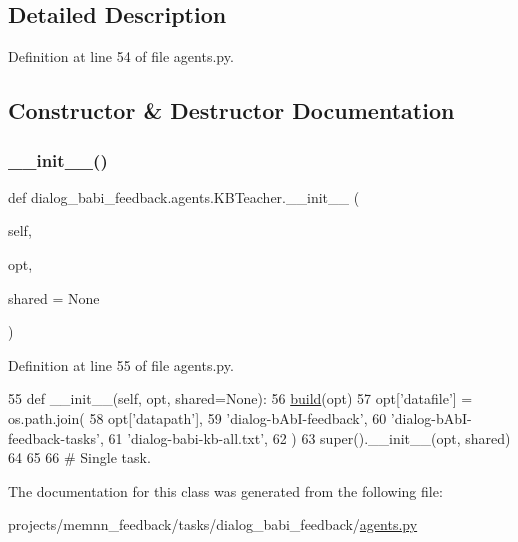 \subsection{Detailed Description}


Definition at line 54 of file agents.\+py.



\subsection{Constructor \& Destructor Documentation}
\mbox{\label{classdialog__babi__feedback_1_1agents_1_1KBTeacher_ad160e36b27da1a5a2d8ff563fb899b09}} 
\subsubsection{\texorpdfstring{\+\_\+\+\_\+init\+\_\+\+\_\+()}{\_\_init\_\_()}}
{\footnotesize\ttfamily def dialog\+\_\+babi\+\_\+feedback.\+agents.\+K\+B\+Teacher.\+\_\+\+\_\+init\+\_\+\+\_\+ (\begin{DoxyParamCaption}\item[{}]{self,  }\item[{}]{opt,  }\item[{}]{shared = {\ttfamily None} }\end{DoxyParamCaption})}



Definition at line 55 of file agents.\+py.


\begin{DoxyCode}
55     \textcolor{keyword}{def }\_\_init\_\_(self, opt, shared=None):
56         \hyperlink{namespaceparlai_1_1mturk_1_1tasks_1_1talkthewalk_1_1download_a8c0fbb9b6dfe127cb8c1bd6e7c4e33fd}{build}(opt)
57         opt[\textcolor{stringliteral}{'datafile'}] = os.path.join(
58             opt[\textcolor{stringliteral}{'datapath'}],
59             \textcolor{stringliteral}{'dialog-bAbI-feedback'},
60             \textcolor{stringliteral}{'dialog-bAbI-feedback-tasks'},
61             \textcolor{stringliteral}{'dialog-babi-kb-all.txt'},
62         )
63         super().\_\_init\_\_(opt, shared)
64 
65 
66 \textcolor{comment}{# Single task.}
\end{DoxyCode}


The documentation for this class was generated from the following file\+:\begin{DoxyCompactItemize}
\item 
projects/memnn\+\_\+feedback/tasks/dialog\+\_\+babi\+\_\+feedback/\hyperlink{projects_2memnn__feedback_2tasks_2dialog__babi__feedback_2agents_8py}{agents.\+py}\end{DoxyCompactItemize}
